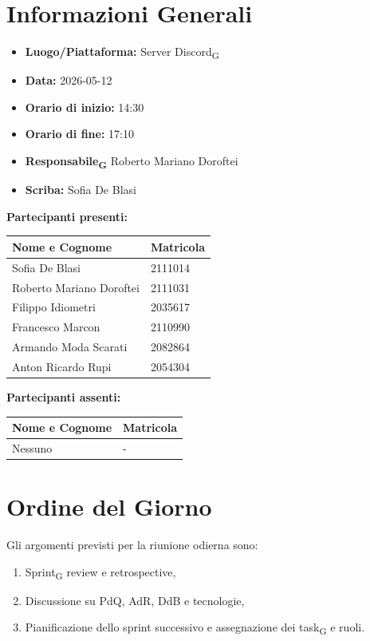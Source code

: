 \section{Informazioni Generali}
\begin{itemize}
	\item \textbf{Luogo/Piattaforma:} Server Discord\textsubscript{G}
	\item \textbf{Data:} 2026-05-12
	\item \textbf{Orario di inizio:} 14:30
	\item \textbf{Orario di fine:} 17:10
	\item \textbf{Responsabile\textsubscript{G}} Roberto Mariano Doroftei
	\item \textbf{Scriba:} Sofia De Blasi
\end{itemize}

\vspace{0.5cm}
\textbf{Partecipanti presenti:}
\begin{table}[ht]
	\centering
	\renewcommand{\arraystretch}{1.2}
	\begin{tabularx}{\textwidth}{X l}
		\toprule
		\textbf{Nome e Cognome} & \textbf{Matricola} \\
		\midrule
		Sofia De Blasi & 2111014 \\
		Roberto Mariano Doroftei & 2111031 \\
		Filippo Idiometri & 2035617 \\
		Francesco Marcon & 2110990 \\
		Armando Moda Scarati & 2082864 \\
		Anton Ricardo Rupi & 2054304 \\
		\bottomrule
	\end{tabularx}
\end{table}

\vspace{0.5cm}
\textbf{Partecipanti assenti:}
\begin{table}[ht]
	\centering
	\renewcommand{\arraystretch}{1.2}
	\begin{tabularx}{\textwidth}{X l}
		\toprule
		\textbf{Nome e Cognome} & \textbf{Matricola} \\
		\midrule
		Nessuno & - \\
		\bottomrule
	\end{tabularx}
\end{table}

\section{Ordine del Giorno}
Gli argomenti previsti per la riunione odierna sono:
\begin{enumerate}
	\item Sprint\textsubscript{G} review e retrospective,
	\item Discussione su PdQ, AdR, DdB e tecnologie,
	\item Pianificazione dello sprint successivo e assegnazione dei task\textsubscript{G} e ruoli.
\end{enumerate}

